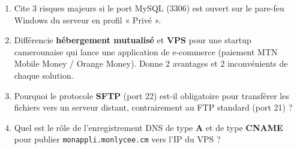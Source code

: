 \documentclass[11pt]{article}
\begin{document}
\begin{exercice}
\begin{enumerate}
    \item Cite 3 risques majeurs si le port MySQL (3306) est ouvert sur le pare-feu Windows du serveur en profil « Privé ».
    \item Différencie \textbf{hébergement mutualisé} et \textbf{VPS} pour une startup camerounaise qui lance une application de e-commerce (paiement MTN Mobile Money / Orange Money). Donne 2 avantages et 2 inconvénients de chaque solution.
    \item Pourquoi le protocole \textbf{SFTP} (port 22) est-il obligatoire pour transférer les fichiers vers un serveur distant, contrairement au FTP standard (port 21) ?
    \item Quel est le rôle de l'enregistrement DNS de type \textbf{A} et de type \textbf{CNAME} pour publier \texttt{monappli.monlycee.cm} vers l'IP du VPS ?
\end{enumerate}
\end{exercice}
\end{document}
